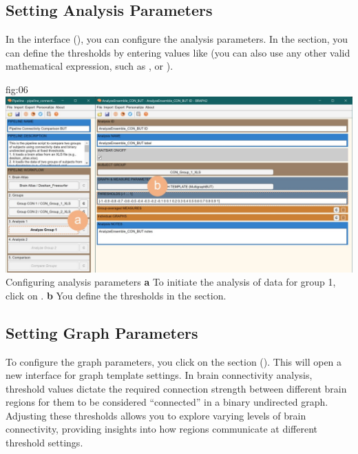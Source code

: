 \documentclass[justified]{tufte-handout}
\begin{document}
\subsection{Setting Analysis Parameters}

In the  interface (), you can configure the analysis parameters.
In the  section, you can define the thresholds by entering values like  (you can also use any other valid mathematical expression, such as , or ).

	{fig:06}
	{
	\includegraphics{fig06.jpg}
	}
	{Configuring analysis parameters}
	{
	{\bf a} To initiate the analysis of data for group 1, click on .
	{\bf b} You define the thresholds in the  section.
	}

\subsection{Setting Graph Parameters}

To configure the graph parameters, you click on the section  (). This will open a new interface for graph template settings. 
In brain connectivity analysis, threshold values dictate the required connection strength between different brain regions for them to be considered “connected” in a binary undirected graph. 
Adjusting these thresholds allows you to explore varying levels of brain connectivity, providing insights into how regions communicate at different threshold settings.
\end{document}
